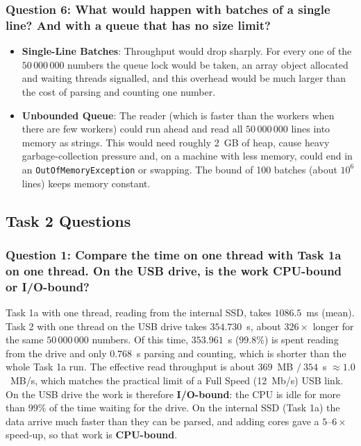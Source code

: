 \documentclass[11pt,a4paper]{article}
\begin{document}
\subsubsection{Question 6: What would happen with batches of a single line? And with a queue that has no size limit?}
\begin{itemize}
    \item \textbf{Single-Line Batches}: Throughput would drop sharply. For every one of the $50\,000\,000$ numbers the queue lock would be taken, an array object allocated and waiting threads signalled, and this overhead would be much larger than the cost of parsing and counting one number.
    \item \textbf{Unbounded Queue}: The reader (which is faster than the workers when there are few workers) could run ahead and read all $50\,000\,000$ lines into memory as strings. This would need roughly 2~GB of heap, cause heavy garbage-collection pressure and, on a machine with less memory, could end in an \texttt{OutOfMemoryException} or swapping. The bound of 100 batches (about $10^6$ lines) keeps memory constant.
\end{itemize}

\subsection{Task 2 Questions}

\subsubsection{Question 1: Compare the time on one thread with Task 1a on one thread. On the USB drive, is the work CPU-bound or I/O-bound?}
Task 1a with one thread, reading from the internal SSD, takes $1086.5$~ms (mean). Task 2 with one thread on the USB drive takes $354.730$~s, about $326\times$ longer for the same $50\,000\,000$ numbers. Of this time, $353.961$~s ($99.8\%$) is spent reading from the drive and only $0.768$~s parsing and counting, which is shorter than the whole Task 1a run. The effective read throughput is about $369$~MB $/\ 354$~s $\approx 1.0$~MB/s, which matches the practical limit of a Full Speed (12~Mb/s) USB link. On the USB drive the work is therefore \textbf{I/O-bound}: the CPU is idle for more than $99\%$ of the time waiting for the drive. On the internal SSD (Task 1a) the data arrive much faster than they can be parsed, and adding cores gave a $5$--$6\times$ speed-up, so that work is \textbf{CPU-bound}.
\end{document}
